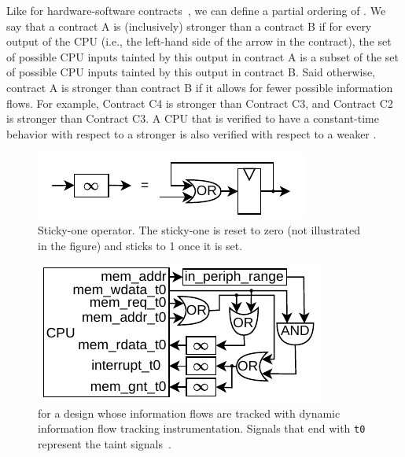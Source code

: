 
Like for hardware-software contracts~\cite{guarnieri2021hardware}, we can define a partial ordering of \pics.
We say that a contract A is (inclusively) stronger than a contract B if for every output of the CPU (i.e., the left-hand side of the arrow in the contract), the set of possible CPU inputs tainted by this output in contract A is a subset of the set of possible CPU inputs tainted by this output in contract B.
Said otherwise, contract A is stronger than contract B if it allows for fewer possible information flows.
For example, Contract C4 is stronger than Contract C3, and Contract C2 is stronger than Contract C3.
A CPU that is verified to have a constant-time behavior with respect to a stronger \pic is also verified with respect to a weaker \pic.

\begin{figure}
    \begin{center}
    \includegraphics[width=.7\columnwidth]{figures/stickyone/stickyone.pdf}
    \end{center}
    \vspace*{-1.4em}
    \caption{Sticky-one operator. The sticky-one is reset to zero (not illustrated in the figure) and sticks to 1 once it is set.}
    \label{fig:stickyone}
\end{figure}


\begin{figure}[t]
    \begin{center}
    \includegraphics[width=.7\columnwidth]{figures/picinstrum_taints/picinstrum_taints.pdf}
    \end{center}
    \vspace*{-1em}
    \caption{\Pici for a design whose information flows are tracked with dynamic information flow tracking instrumentation. Signals that end with \texttt{t0} represent the taint signals~\cite{tiwari2009complete,solt2022cellift}.
    }
    \label{fig:pic_instrum_taints}
    \vspace*{-.4em}
\end{figure}

